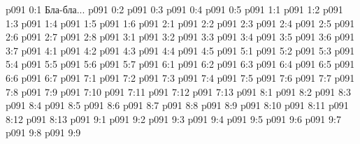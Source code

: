 \author{Глава промежуточных созданий}
\vs p091 0:1  Бла-бла...
\vs p091 0:2 
\vs p091 0:3 
\vs p091 0:4 
\vs p091 0:5 
\vs p091 1:1 
\vs p091 1:2 \pc 
\vs p091 1:3 
\vs p091 1:4 
\vs p091 1:5 \pc 
\vs p091 1:6 \pc 
{}
\vs p091 2:1 
\vs p091 2:2 
\vs p091 2:3 \pc 
\vs p091 2:4 \pc 
\vs p091 2:5 
\vs p091 2:6 
\vs p091 2:7 
\vs p091 2:8 
\vs p091 3:1 
\vs p091 3:2 
\vs p091 3:3 
\vs p091 3:4 
\vs p091 3:5 
\vs p091 3:6 
\vs p091 3:7 
\vs p091 4:1 
\vs p091 4:2 
\vs p091 4:3 
\vs p091 4:4 
\vs p091 4:5 \pc 
{}
\vs p091 5:1 
\vs p091 5:2 
\vs p091 5:3 \pc 
\vs p091 5:4 
\vs p091 5:5 
\vs p091 5:6 \pc 
\vs p091 5:7 
\vs p091 6:1 
\vs p091 6:2 
\vs p091 6:3 
\vs p091 6:4 
\vs p091 6:5 \pc 
\vs p091 6:6 \pc 
\vs p091 6:7 
\vs p091 7:1 
\vs p091 7:2 
\vs p091 7:3 
\vs p091 7:4 
\vs p091 7:5 
\vs p091 7:6 
\vs p091 7:7 
\vs p091 7:8 
\vs p091 7:9 
\vs p091 7:10 
\vs p091 7:11 
\vs p091 7:12 
\vs p091 7:13 \pc 
{}
\vs p091 8:1 
\vs p091 8:2 \pc 
\vs p091 8:3 \pc 
\vs p091 8:4 
\vs p091 8:5 
\vs p091 8:6 
\vs p091 8:7 
\vs p091 8:8 \pc 
\vs p091 8:9 \pc 
\vs p091 8:10 
\vs p091 8:11 
\vs p091 8:12 
\vs p091 8:13 
\vs p091 9:1 
\vs p091 9:2 
\vs p091 9:3 
\vs p091 9:4 
\vs p091 9:5 
\vs p091 9:6 
\vs p091 9:7 
\vs p091 9:8 
\vsetoff
\vs p091 9:9 
\quizlink
